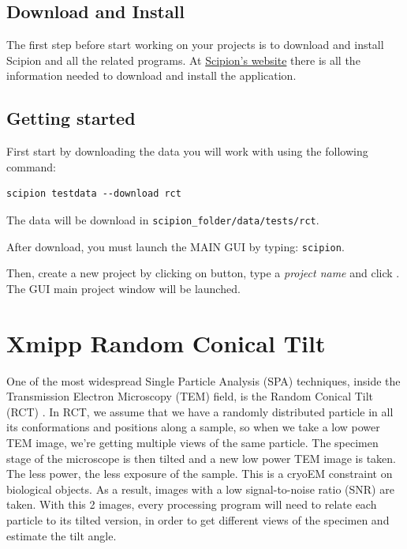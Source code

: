 \documentclass[12pt]{article} %
\begin{document}
\subsection{Download and Install}

The first step before start working on your projects is to download and
install Scipion and all the related programs. At \href{http://scipionwiki.cnb.csic.es}{Scipion's website} 
there is all the information needed to download and install the application.

\subsection{Getting started}

First start by downloading the data you will work with using the following command:

\begin{verbatim}
scipion testdata --download rct
\end{verbatim}

The data will be download in \verb+scipion_folder/data/tests/rct+.

After download, you must launch the MAIN GUI by typing: \verb+scipion+.

Then, create a new project by clicking on  button, type a 
\textit{project name} and click . The GUI main project window will be launched.

\section{Xmipp Random Conical Tilt}

One of the most widespread Single Particle Analysis (SPA) techniques, inside the Transmission
Electron Microscopy (TEM) field, is the Random Conical Tilt (RCT) \citep{Radermacher1987a}. 
In RCT, we assume that we have a randomly distributed particle in all its conformations and positions 
along a sample, so when we take a low power TEM image, we’re getting multiple views of the same particle. 
The specimen stage of the microscope is then tilted and a new low power TEM image is taken. 
The less power, the less exposure of the sample. This is a cryoEM constraint on biological objects. 
As a result, images with a low signal-to-noise ratio (SNR) are taken. With this 2 images, 
every processing program will need to relate each particle to its tilted version, 
in order to get different views of the specimen and estimate the tilt angle.
\end{document}

